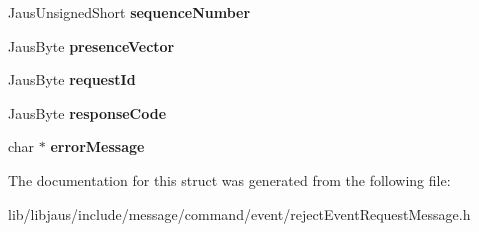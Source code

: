 \begin{DoxyCompactItemize}
\item 
\hypertarget{struct_reject_event_request_message_struct_aa19a98d25ba547109f9c966263c18b53}{\-Jaus\-Unsigned\-Short {\bfseries sequence\-Number}}\label{struct_reject_event_request_message_struct_aa19a98d25ba547109f9c966263c18b53}

\item 
\hypertarget{struct_reject_event_request_message_struct_ad84c447fbede4f4cb8117e40bd03e52d}{\-Jaus\-Byte {\bfseries presence\-Vector}}\label{struct_reject_event_request_message_struct_ad84c447fbede4f4cb8117e40bd03e52d}

\item 
\hypertarget{struct_reject_event_request_message_struct_a943675c17042a1ca18d490cd6ac86907}{\-Jaus\-Byte {\bfseries request\-Id}}\label{struct_reject_event_request_message_struct_a943675c17042a1ca18d490cd6ac86907}

\item 
\hypertarget{struct_reject_event_request_message_struct_a4c08fe3ca2ecae727270151894f3dac5}{\-Jaus\-Byte {\bfseries response\-Code}}\label{struct_reject_event_request_message_struct_a4c08fe3ca2ecae727270151894f3dac5}

\item 
\hypertarget{struct_reject_event_request_message_struct_a0280d0212a4d677db79d238791cfc5f0}{char $\ast$ {\bfseries error\-Message}}\label{struct_reject_event_request_message_struct_a0280d0212a4d677db79d238791cfc5f0}

\end{DoxyCompactItemize}


\-The documentation for this struct was generated from the following file\-:\begin{DoxyCompactItemize}
\item 
lib/libjaus/include/message/command/event/reject\-Event\-Request\-Message.\-h\end{DoxyCompactItemize}
